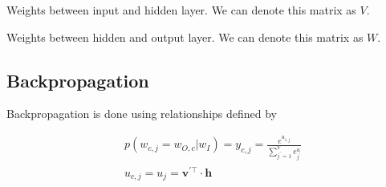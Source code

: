 \documentclass{article}
\begin{document}
\medbreak

Weights between input and hidden layer. We can denote this matrix as $V$.

\medbreak

Weights between hidden and output layer. We can denote this matrix as $W$.

\subsection{Backpropagation}

Backpropagation is done using relationships defined by

\begin{align*}
	&p(w_{c,j} = w_{O,c} | w_I) = y_{c,j} = \frac{e^{u_{c,j}}}{\sum_{j^\prime=1}^V e^u_{j^\prime}} \\
	&u_{c,j} = u_j = \boldsymbol{v^{\prime\top}} \cdot \boldsymbol{h}
\end{align*}
\end{document}

